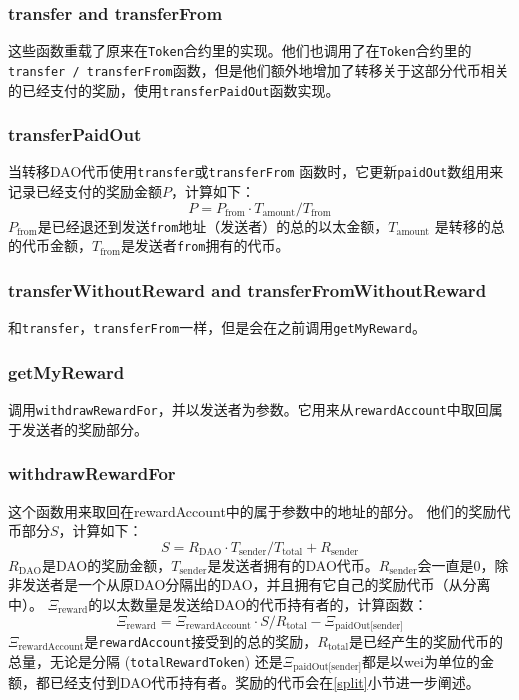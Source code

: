 \documentclass[9pt,oneside]{amsart}
\begin{document}
\begin{multicols}{2}
\begin{description}
\subsubsection*{transfer and transferFrom}
这些函数重载了原来在\verb|Token|合约里的实现。他们也调用了在\verb|Token|合约里的\verb|transfer / transferFrom|函数，但是他们额外地增加了转移关于这部分代币相关的已经支付的奖励，使用\verb|transferPaidOut|函数实现。

\subsubsection*{transferPaidOut}
当转移DAO代币使用\verb|transfer|或\verb|transferFrom| 函数时，它更新\verb|paidOut|数组用来记录已经支付的奖励金额$P$，计算如下：
\begin{equation}
 P = P_{\text{from}} \cdot T_{\text{amount}} / T_{\text{from}}
\end{equation}
$P_{\text{from}}$是已经退还到发送\verb|from|地址（发送者）的总的以太金额，$T_{\text{amount}}$ 是转移的总的代币金额，$T_{\text{from}}$是发送者\verb|from|拥有的代币。

\subsubsection*{transferWithoutReward and transferFromWithoutReward}
和\verb|transfer|，\verb|transferFrom|一样，但是会在之前调用\verb|getMyReward|。

\subsubsection*{getMyReward}
调用\verb|withdrawRewardFor|，并以发送者为参数。它用来从\verb|rewardAccount|中取回属于发送者的奖励部分。

\subsubsection*{withdrawRewardFor}
这个函数用来取回在rewardAccount中的属于参数中的地址的部分。
他们的奖励代币部分$S$，计算如下：
\begin{equation}
 S = R_{\text{DAO}} \cdot T_{\text{sender}} / T_{\text{total}} + R_{\text{sender}}
\end{equation}
$R_{\text{DAO}}$是DAO的奖励金额，$T_{\text{sender}}$是发送者拥有的DAO代币。$R_{\text{sender}}$会一直是0，除非发送者是一个从原DAO分隔出的DAO，并且拥有它自己的奖励代币（从分离中）。
$\Xi_{\text{reward}}$的以太数量是发送给DAO的代币持有者的，计算函数：
\begin{equation}
\Xi_{\text{reward}} = \Xi_{\text{rewardAccount}} \cdot S / R_{\text{total}} - \Xi_{\text{paidOut[sender]}}
\end{equation}
$\Xi_{\text{rewardAccount}}$是\verb|rewardAccount|接受到的总的奖励，$R_{\text{total}}$是已经产生的奖励代币的总量，无论是分隔 (\verb|totalRewardToken|) 还是$\Xi_{\text{paidOut[sender]}}$都是以wei为单位的金额，都已经支付到DAO代币持有者。奖励的代币会在\ref{split}小节进一步阐述。

\end{description}
\end{multicols}
\end{document}
